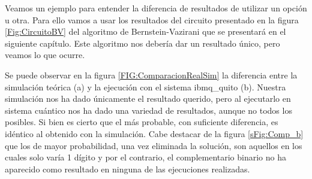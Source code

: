  Veamos un ejemplo para entender la diferencia de resultados de utilizar un opción u otra. Para ello vamos a usar los resultados del circuito presentado en la figura \ref{Fig:CircuitoBV} del algoritmo de Bernstein-Vazirani que se presentará en el siguiente capítulo. Este algoritmo nos debería dar un resultado único, pero veamos lo que ocurre. \newline


Se puede observar en la figura \ref{FIG:ComparacionRealSim} la diferencia entre la simulación teórica (a) y la ejecución con el sistema ibmq\_quito (b). Nuestra simulación nos ha dado únicamente el resultado querido, pero al ejecutarlo en sistema cuántico nos ha dado una variedad de resultados, aunque no todos los posibles. Si bien es cierto que el más probable, con suficiente diferencia, es idéntico al obtenido con la simulación. Cabe destacar de la figura \ref{sFig:Comp_b} que los de mayor probabilidad, una vez eliminada la solución, son aquellos en los cuales solo varía 1 dígito y por el contrario, el complementario binario no ha aparecido como resultado en ninguna de las ejecuciones realizadas.

